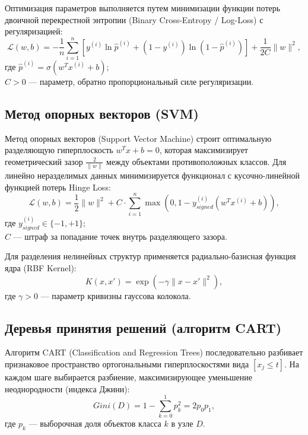 \documentclass[14pt,a4paper]{extarticle}
\begin{document}
Оптимизация параметров выполняется путем минимизации функции потерь двоичной перекрестной энтропии (Binary Cross-Entropy / Log-Loss) с регуляризацией:
\begin{equation}
    \mathcal{L}(w, b) = -\frac{1}{n} \sum_{i=1}^n \left[ y^{(i)} \ln \hat{p}^{(i)} + (1 - y^{(i)}) \ln (1 - \hat{p}^{(i)}) \right] + \frac{1}{2C} \|w\|^2,
\end{equation}
где $\hat{p}^{(i)} = \sigma(w^T x^{(i)} + b)$;\\
$C > 0$ --- параметр, обратно пропорциональный силе регуляризации.

\subsection{Метод опорных векторов (SVM)}

Метод опорных векторов (Support Vector Machine) строит оптимальную разделяющую гиперплоскость $w^T x + b = 0$, которая максимизирует геометрический зазор $\frac{2}{\|w\|}$ между объектами противоположных классов. Для линейно неразделимых данных минимизируется функционал с кусочно-линейной функцией потерь Hinge Loss:
\begin{equation}
    \mathcal{L}(w, b) = \frac{1}{2} \|w\|^2 + C \cdot \sum_{i=1}^n \max\left(0, 1 - y_{signed}^{(i)} (w^T x^{(i)} + b)\right),
\end{equation}
где $y_{signed}^{(i)} \in \{-1, +1\}$;\\
$C$ --- штраф за попадание точек внутрь разделяющего зазора.

Для разделения нелинейных структур применяется радиально-базисная функция ядра (RBF Kernel):
\begin{equation}
    K(x, x') = \exp\left(-\gamma \|x - x'\|^2\right),
\end{equation}
где $\gamma > 0$ --- параметр кривизны гауссова колокола.

\subsection{Деревья принятия решений (алгоритм CART)}

Алгоритм CART (Classification and Regression Trees) последовательно разбивает признаковое пространство ортогональными гиперплоскостями вида $[x_j \le t]$. На каждом шаге выбирается разбиение, максимизирующее уменьшение неоднородности (индекса Джини):
\begin{equation}
    Gini(D) = 1 - \sum_{k=0}^1 p_k^2 = 2 p_0 p_1,
\end{equation}
где $p_k$ --- выборочная доля объектов класса $k$ в узле $D$.
\end{document}
